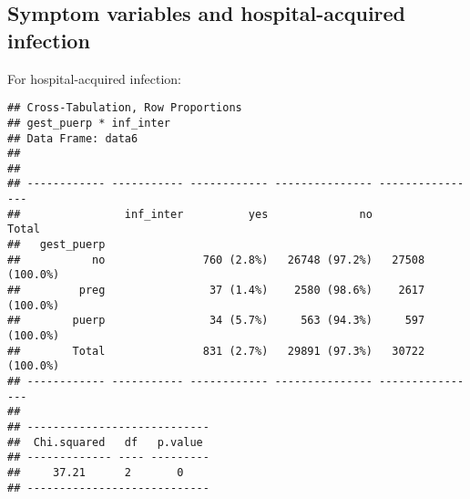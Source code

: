 \documentclass[
]{article}
\newenvironment{Shaded}{\begin{snugshade}}{\end{snugshade}}
\newcommand{\DataTypeTok}[1]{\textcolor[rgb]{0.13,0.29,0.53}{#1}}
\newcommand{\KeywordTok}[1]{\textcolor[rgb]{0.13,0.29,0.53}{\textbf{#1}}}
\newcommand{\NormalTok}[1]{#1}
\newcommand{\OperatorTok}[1]{\textcolor[rgb]{0.81,0.36,0.00}{\textbf{#1}}}
\newcommand{\OtherTok}[1]{\textcolor[rgb]{0.56,0.35,0.01}{#1}}
\newcommand{\StringTok}[1]{\textcolor[rgb]{0.31,0.60,0.02}{#1}}
\begin{document}
\hypertarget{symptom-variables-and-hospital-acquired-infection}{%
\subsection{Symptom variables and hospital-acquired
infection}\label{symptom-variables-and-hospital-acquired-infection}}

For hospital-acquired infection:

\begin{Shaded}
\end{Shaded}

\begin{verbatim}
## Cross-Tabulation, Row Proportions  
## gest_puerp * inf_inter  
## Data Frame: data6  
## 
## 
## ------------ ----------- ------------ --------------- ----------------
##                inf_inter          yes              no            Total
##   gest_puerp                                                          
##           no               760 (2.8%)   26748 (97.2%)   27508 (100.0%)
##         preg                37 (1.4%)    2580 (98.6%)    2617 (100.0%)
##        puerp                34 (5.7%)     563 (94.3%)     597 (100.0%)
##        Total               831 (2.7%)   29891 (97.3%)   30722 (100.0%)
## ------------ ----------- ------------ --------------- ----------------
## 
## ----------------------------
##  Chi.squared   df   p.value 
## ------------- ---- ---------
##     37.21      2       0    
## ----------------------------
\end{verbatim}

\begin{Shaded}
\end{Shaded}
\end{document}
